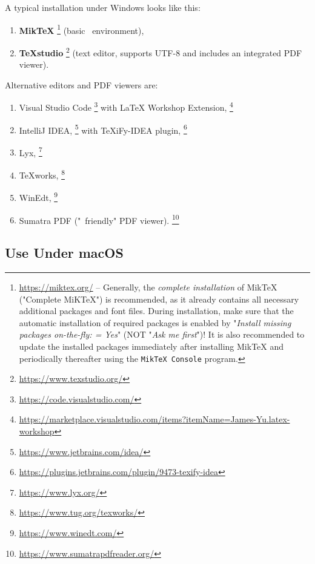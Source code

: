A typical installation under Windows looks like this:
%
\begin{enumerate}
\item \textbf{MikTeX}%
	\footnote{\url{https://miktex.org/} -- 
  Generally, the \emph{complete installation} of MikTeX ("Complete MiKTeX") is 
	recommended, as it already contains all necessary additional packages and font files.
	During installation, make sure that the automatic installation of required packages
	is enabled by "\emph{Install missing packages on-the-fly: = Yes}" 
	(NOT "\emph{Ask me first}")!
	It is also recommended to update the installed packages immediately after installing MikTeX 
	and periodically thereafter using the \texttt{MikTeX Console} program.} 
	(basic \latex\ environment),
\item \textbf{TeXstudio}%
	\footnote{\url{https://www.texstudio.org/}}
	(text editor, supports UTF-8 and includes an integrated PDF viewer).
\end{enumerate}
%
Alternative editors and PDF viewers are:
%
\begin{enumerate}
	\item Visual Studio Code%
	\footnote{\url{https://code.visualstudio.com/}}
	with LaTeX Workshop Extension,%
	\footnote{\url{https://marketplace.visualstudio.com/items?itemName=James-Yu.latex-workshop}}
	\item IntelliJ IDEA,%
	\footnote{\url{https://www.jetbrains.com/idea/}}
	with TeXiFy-IDEA plugin,%
	\footnote{\url{https://plugins.jetbrains.com/plugin/9473-texify-idea}}
	\item Lyx,%
	\footnote{\url{https://www.lyx.org/}}
	\item TeXworks,%
	\footnote{\url{https://www.tug.org/texworks/}}
	\item WinEdt,%
	\footnote{\url{https://www.winedt.com/}}
	\item Sumatra PDF ("\latex\ friendly" PDF viewer).%
	\footnote{\url{https://www.sumatrapdfreader.org/}}
\end{enumerate}


\subsection{Use Under macOS}

